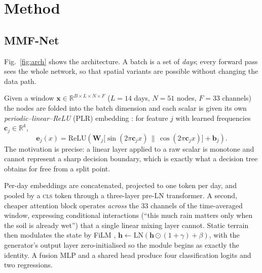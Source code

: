\documentclass[conference]{IEEEtran}
\begin{document}
\section{Method}

\subsection{MMF-Net}
Fig.~\ref{fig:arch} shows the architecture. A batch is a set of \emph{days};
every forward pass sees the whole network, so that spatial variants are possible
without changing the data path.

Given a window $\mathbf{x}\in\mathbb{R}^{B\times L\times N\times F}$
($L=14$ days, $N=51$ nodes, $F=33$ channels) the nodes are folded into the batch
dimension and each scalar is given its own \emph{periodic--linear--ReLU} (PLR)
embedding \cite{gorishniy2022}: for feature $j$ with learned frequencies
$\mathbf{c}_j\in\mathbb{R}^{k}$,
\begin{equation}
\mathbf{e}_j(x)=\mathrm{ReLU}\!\left(\mathbf{W}_j
\big[\sin(2\pi\mathbf{c}_j x)\,\|\,\cos(2\pi\mathbf{c}_j x)\big]+\mathbf{b}_j\right).
\end{equation}
The motivation is precise: a linear layer applied to a raw scalar is monotone and
cannot represent a sharp decision boundary, which is exactly what a decision tree
obtains for free from a split point.

Per-day embeddings are concatenated, projected to one token per day, and pooled
by a \textsc{cls} token through a three-layer pre-LN transformer. A second,
cheaper attention block operates \emph{across} the 33 channels of the
time-averaged window, expressing conditional interactions (``this much rain
matters only when the soil is already wet'') that a single linear mixing layer
cannot. Static terrain then modulates the state by FiLM \cite{perez2018},
$\mathbf{h}\leftarrow\mathrm{LN}\!\left(\mathbf{h}\odot(1+\gamma)+\beta\right)$,
with the generator's output layer zero-initialised so the module begins as
exactly the identity. A fusion MLP and a shared head produce four classification
logits and two regressions.
\end{document}
